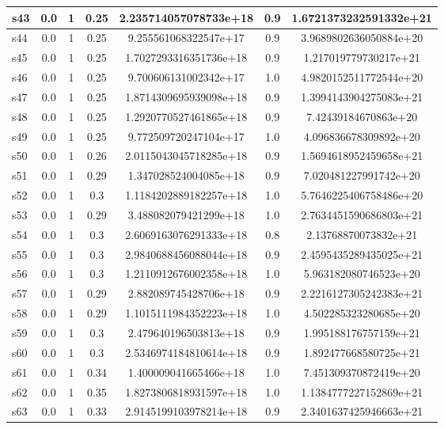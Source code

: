 \documentclass{article}
\begin{document}
\begin{tabular}{|l|c|c|c|c|c|c|}
\hline
s43 &0.0 & 1 & 0.25 & 2.235714057078733e+18 & 0.9 & 1.6721373232591332e+21\\
\hline
s44 &0.0 & 1 & 0.25 & 9.255561068322547e+17 & 0.9 & 3.9689802636050884e+20\\
\hline
s45 &0.0 & 1 & 0.25 & 1.7027293316351736e+18 & 0.9 & 1.217019779730217e+21\\
\hline
s46 &0.0 & 1 & 0.25 & 9.700606131002342e+17 & 1.0 & 4.9820152511772544e+20\\
\hline
s47 &0.0 & 1 & 0.25 & 1.8714309695939098e+18 & 0.9 & 1.3994143904275083e+21\\
\hline
s48 &0.0 & 1 & 0.25 & 1.2920770527461865e+18 & 0.9 & 7.42439184670863e+20\\
\hline
s49 &0.0 & 1 & 0.25 & 9.772509720247104e+17 & 1.0 & 4.096836678309892e+20\\
\hline
s50 &0.0 & 1 & 0.26 & 2.0115043045718285e+18 & 0.9 & 1.5694618952459658e+21\\
\hline
s51 &0.0 & 1 & 0.29 & 1.347028524004085e+18 & 0.9 & 7.020481227991742e+20\\
\hline
s52 &0.0 & 1 & 0.3 & 1.1184202889182257e+18 & 1.0 & 5.7646225406758486e+20\\
\hline
s53 &0.0 & 1 & 0.29 & 3.488082079421299e+18 & 1.0 & 2.7634451590686803e+21\\
\hline
s54 &0.0 & 1 & 0.3 & 2.6069163076291333e+18 & 0.8 & 2.13768870073832e+21\\
\hline
s55 &0.0 & 1 & 0.3 & 2.9840688456088044e+18 & 0.9 & 2.4595435289435025e+21\\
\hline
s56 &0.0 & 1 & 0.3 & 1.2110912676002358e+18 & 1.0 & 5.963182080746523e+20\\
\hline
s57 &0.0 & 1 & 0.29 & 2.882089745428706e+18 & 0.9 & 2.2216127305242383e+21\\
\hline
s58 &0.0 & 1 & 0.29 & 1.1015111984352223e+18 & 1.0 & 4.502285323280685e+20\\
\hline
s59 &0.0 & 1 & 0.3 & 2.479640196503813e+18 & 0.9 & 1.995188176757159e+21\\
\hline
s60 &0.0 & 1 & 0.3 & 2.5346974184810614e+18 & 0.9 & 1.892477668580725e+21\\
\hline
s61 &0.0 & 1 & 0.34 & 1.400009041665466e+18 & 1.0 & 7.451309370872419e+20\\
\hline
s62 &0.0 & 1 & 0.35 & 1.8273806818931597e+18 & 1.0 & 1.1384777227152869e+21\\
\hline
s63 &0.0 & 1 & 0.33 & 2.9145199103978214e+18 & 0.9 & 2.3401637425946663e+21\\
\hline

\end{tabular}
\end{document}
